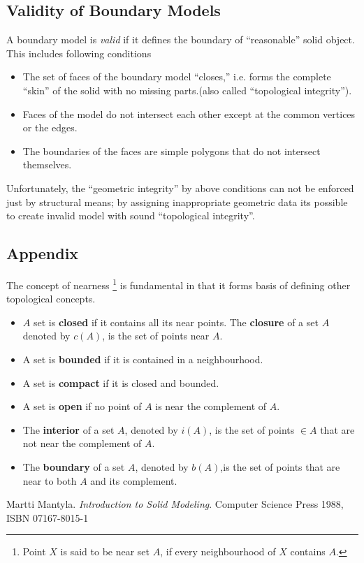 \documentclass[12pt,a4paper,openbib]{article}
\begin{document}
\subsection{Validity of Boundary Models} A boundary model is {\em valid} if it
defines the boundary of ``reasonable'' solid object. This includes following
conditions
\begin{itemize}
	\item The set of faces of the boundary model ``closes,'' i.e. forms the
		complete ``skin'' of the solid with no missing parts.(also called
		``topological integrity'').
	\item Faces of the model do not intersect each other except at the common
		vertices or the edges.
	\item The boundaries of the faces are simple polygons that do not intersect
		themselves.
\end{itemize}
	Unfortunately, the ``geometric integrity'' by above conditions can not be
	enforced just by structural means; by assigning inappropriate geometric
	data its possible to create invalid model with sound ``topological 
	integrity''.

\begin{appendix}
\section{Appendix}
The concept of nearness \footnote{Point $X$ is said to be near set $A$, if
every neighbourhood of $X$ contains $A$.} is fundamental in that it forms basis
of defining other topological concepts.
\begin{itemize}
\item $A$ set is {\bf closed} if it contains all its near points. The {\bf closure} of a set $A$ denoted by $c(A)$, is the set of points near $A$.
\item A set is {\bf bounded} if it is contained in a neighbourhood.
\item A set is {\bf compact} if it is closed and bounded.
\item A set is {\bf open} if no point of $A$ is near the complement of $A$.
\item The {\bf interior} of a set $A$, denoted by $i(A)$, is the set of points
	$\in A$ that are not near the complement of  $A$.
\item The {\bf boundary} of a set $A$, denoted by $b(A)$,is the set of points
that are near to both $A$ and its complement.
\end{itemize}
\end{appendix}

\begin{thebibliography}{6}


    Martti Mantyla.
    \textsl{Introduction to Solid Modeling}.
    Computer Science Press 1988,
    ISBN 07167-8015-1

\end{thebibliography}
\end{document}
